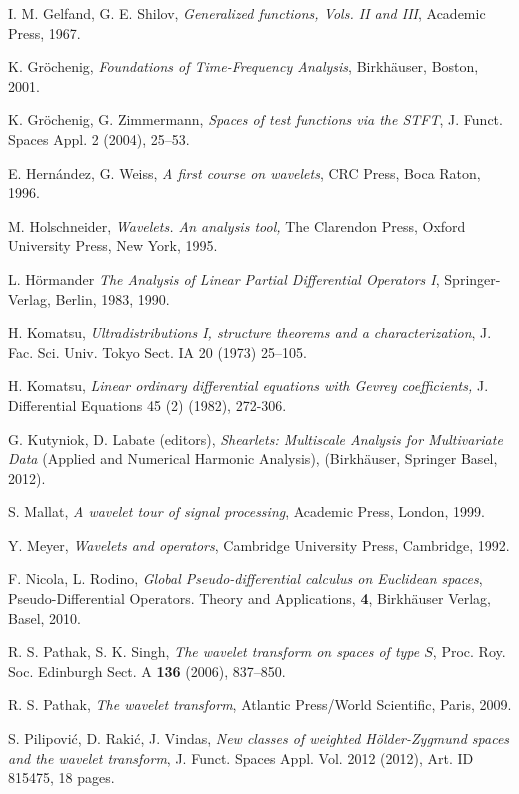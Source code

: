 \documentclass[reqno,12pt]{amsart}
\theoremstyle{plain}
\theoremstyle{definition}
\theoremstyle{remark}
\begin{document}
\begin{thebibliography}{99}
 I. M. {G}elfand, G. E. {S}hilov, \textit{Generalized
functions, Vols. II and III}, Academic Press, 1967.

 K. Gr{\"o}chenig,
\textit{Foundations of Time-Frequency Analysis},
\newblock Birkh\"auser, Boston, 2001.

 K. Gr\"{o}chenig, G. Zimmermann,
\textit{Spaces of test functions via the STFT},
 J. Funct. Spaces Appl. 2  (2004), 25--53.

 E. Hern\'andez, G. Weiss, \textit{A first course on wavelets}, CRC Press, Boca Raton, 1996.

 M. Holschneider, \textit{Wavelets. An analysis tool,} The Clarendon Press, Oxford University Press, New York, 1995.

  L. H{\"o}rmander \textit{The Analysis of Linear
Partial Differential Operators I},
Springer-Verlag, Berlin, 1983, 1990.

 H. Komatsu, \textit{Ultradistributions I, structure
theorems and  a characterization}, J. Fac. Sci. Univ. Tokyo Sect. IA  20 (1973) 25--105.

 H. Komatsu,
\textit{Linear ordinary differential equations with Gevrey coefficients,}
J. Differential Equations 45 (2) (1982), 272-306.

G. Kutyniok, D. Labate (editors),
\textit{Shearlets: Multiscale Analysis for Multivariate Data} (Applied and Numerical Harmonic Analysis),
(Birkh\"auser, Springer Basel, 2012).

 S. Mallat, {\em A wavelet tour of signal processing},
Academic Press, London, 1999.

  Y. Meyer, \textit{Wavelets and operators}, Cambridge University Press, Cambridge, 1992.

 F. Nicola, L. Rodino, \textit{Global Pseudo-differential
calculus on Euclidean spaces}, Pseudo-Differential Operators. Theory and Applications, \textbf{4}, {B}irkh{\"a}user Verlag, Basel, 2010.

 R. S. Pathak, S. K. Singh, \textit{The wavelet transform
on spaces of type $S$}, {P}roc. {R}oy. {S}oc. {E}dinburgh {S}ect. A
\textbf{136} (2006), 837--850.

 R. S. {P}athak, \textit{{T}he wavelet transform}, Atlantic Press/World Scientific, Paris, 2009.

 S. Pilipovi\'{c}, D. Raki\'{c},  J. Vindas,
\textit{New classes of weighted H\"{o}lder-Zygmund spaces and the
wavelet transform},  J. Funct. Spaces Appl. Vol. 2012 (2012), Art. ID 815475, 18 pages.


\end{thebibliography}
\end{document}

